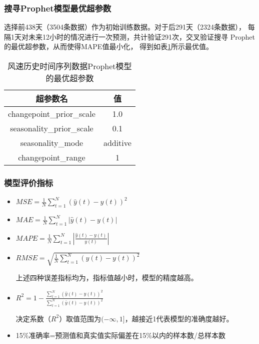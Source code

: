 \documentclass[14pt, AutoFakeBold]{ppt}
\begin{document}
\begin{frame}
  \frametitle{搜寻Prophet模型最优超参数}
  选择前438天（3504条数据）作为初始训练数据。对于后291天（2324条数据），
  每隔1天对未来12小时的情况进行一次预测，共计验证291次，交叉验证搜寻
  Prophet的最优超参数，从而使得MAPE值最小化，
  得到如表\ref{prophet_param}所示最优值。

\begin{table}[H]
  \centering
  \caption{风速历史时间序列数据Prophet模型的最优超参数}
  \begin{tabular}{cc}
  \toprule
  超参数名 & 值 \\
  \midrule
  changepoint\_prior\_scale & 1.0 \\
  seasonality\_prior\_scale & 0.1 \\
  seasonality\_mode & additive \\
  changepoint\_range & 1 \\
  \bottomrule
  \end{tabular}
  \label{prophet_param}
\end{table}
\end{frame}

\begin{frame}
  \frametitle{模型评价指标}
  \begin{itemize}
    \item $MSE=\frac{1}{N}\sum_{t=1}^{N}\left(\hat{y}\left(t\right)-y\left(t\right)\right)^2$
    \item $MAE=\frac{1}{N}\sum_{t=1}^{N}\left|\hat{y}\left(t\right)-y\left(t\right)\right|$
    \item $MAPE=\frac{1}{N}\sum_{t=1}^{N}\left|\frac{\hat{y}\left(t\right)-y\left(t\right)}{y\left(t\right)}\right|$
    \item $RMSE=\sqrt{\frac{1}{N}\sum_{t=1}^{N}\left(\hat{y}\left(t\right)-y\left(t\right)\right)^2}$
    
    上述四种误差指标均为，指标值越小时，模型的精度越高。
    \item $R^2=1-\frac{\sum_{t=1}^{N}(\hat{y}\left(t\right)-y\left(t\right))^2}{\sum_{t=1}^{N}(\bar{y}\left(t\right)-y\left(t\right))^2}$
    
    决定系数（$R^2$）取值范围为$(-\infty, 1]$，越接近1代表模型的准确度越好。
    \item 15\%准确率=预测值和真实值实际偏差在15\%以内的样本数/总样本数
  \end{itemize}
\end{frame}
\end{document}
